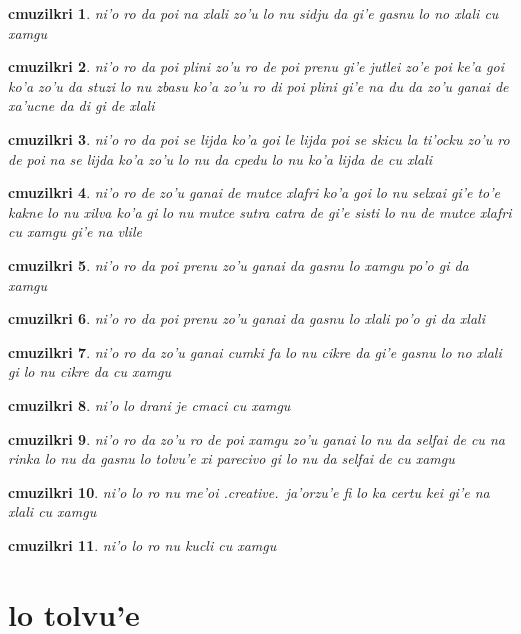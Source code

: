 \documentclass{report}
\newtheorem{cmuzilkri}{cmuzilkri}
\begin{document}
\begin{cmuzilkri}
	ni'o ro da poi na xlali zo'u lo nu sidju da gi'e gasnu lo no xlali cu xamgu
\end{cmuzilkri}
\begin{cmuzilkri}
	ni'o ro da poi plini zo'u ro de poi prenu gi'e jutlei zo'e poi ke'a goi ko'a zo'u da stuzi lo nu zbasu ko'a zo'u ro di poi plini gi'e na du da zo'u ganai de xa'ucne da di gi de xlali
\end{cmuzilkri}
\begin{cmuzilkri}
	ni'o ro da poi se lijda ko'a goi le lijda poi se skicu la ti'ocku zo'u ro de poi na se lijda ko'a zo'u lo nu da cpedu lo nu ko'a lijda de cu xlali
\end{cmuzilkri}
\begin{cmuzilkri}
	ni'o ro de zo'u ganai de mutce xlafri ko'a goi lo nu selxai gi'e to'e kakne lo nu xilva ko'a gi lo nu mutce sutra catra de gi'e sisti lo nu de mutce xlafri cu xamgu gi'e na vlile
\end{cmuzilkri}
\begin{cmuzilkri}
	ni'o ro da poi prenu zo'u ganai da gasnu lo xamgu po'o gi da xamgu
\end{cmuzilkri}
\begin{cmuzilkri}
	ni'o ro da poi prenu zo'u ganai da gasnu lo xlali po'o gi da xlali
\end{cmuzilkri}
\begin{cmuzilkri}
	ni'o ro da zo'u ganai cumki fa lo nu cikre da gi'e gasnu lo no xlali gi lo nu cikre da cu xamgu
\end{cmuzilkri}
\begin{cmuzilkri}
	ni'o lo drani je cmaci cu xamgu
\end{cmuzilkri}
\begin{cmuzilkri}
	ni'o ro da zo'u ro de poi xamgu zo'u ganai lo nu da selfai de cu na rinka lo nu da gasnu lo tolvu'e xi parecivo gi lo nu da selfai de cu xamgu
\end{cmuzilkri}
\begin{cmuzilkri}
	ni'o lo ro nu me'oi .creative.\ ja'orzu'e fi lo ka certu kei gi'e na xlali cu xamgu
\end{cmuzilkri}
\begin{cmuzilkri}
	ni'o lo ro nu kucli cu xamgu
\end{cmuzilkri}

\section{lo tolvu'e}
\end{document}
